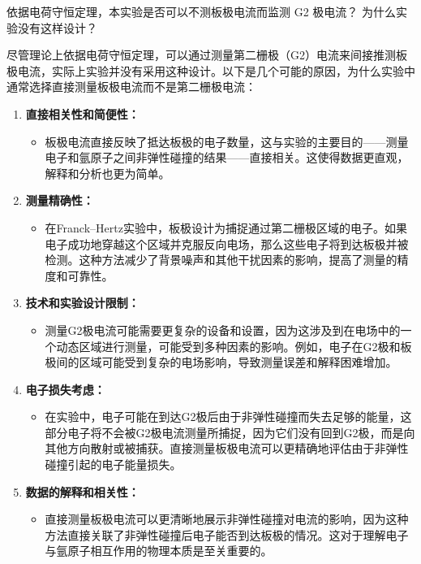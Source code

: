 \documentclass[dvipsnames, svgnames,a4paper,11pt]{article}
\begin{document}
	
	\begin{question}
		依据电荷守恒定理，本实验是否可以不测板极电流而监测 G2 极电流？ 为什么实验没有这样设计？
	\end{question}
	尽管理论上依据电荷守恒定理，可以通过测量第二栅极（G2）电流来间接推测板极电流，实际上实验并没有采用这种设计。以下是几个可能的原因，为什么实验中通常选择直接测量板极电流而不是第二栅极电流：	
	\begin{enumerate}
		\item \textbf{直接相关性和简便性：}
		
		\begin{itemize}
			\item 板极电流直接反映了抵达板极的电子数量，这与实验的主要目的——测量电子和氩原子之间非弹性碰撞的结果——直接相关。这使得数据更直观，解释和分析也更为简单。
		\end{itemize}
		
		\item \textbf{测量精确性：}
		
		\begin{itemize}
			\item 在Franck–Hertz实验中，板极设计为捕捉通过第二栅极区域的电子。如果电子成功地穿越这个区域并克服反向电场，那么这些电子将到达板极并被检测。这种方法减少了背景噪声和其他干扰因素的影响，提高了测量的精度和可靠性。
		\end{itemize}
		
		\item \textbf{技术和实验设计限制：}
		
		\begin{itemize}
			\item 测量G2极电流可能需要更复杂的设备和设置，因为这涉及到在电场中的一个动态区域进行测量，可能受到多种因素的影响。例如，电子在G2极和板极间的区域可能受到复杂的电场影响，导致测量误差和解释困难增加。
		\end{itemize}
		
		\item \textbf{电子损失考虑：}
		
		\begin{itemize}
			\item 在实验中，电子可能在到达G2极后由于非弹性碰撞而失去足够的能量，这部分电子将不会被G2极电流测量所捕捉，因为它们没有回到G2极，而是向其他方向散射或被捕获。直接测量板极电流可以更精确地评估由于非弹性碰撞引起的电子能量损失。
		\end{itemize}
		
		\item \textbf{数据的解释和相关性：}
		
		\begin{itemize}
			\item 直接测量板极电流可以更清晰地展示非弹性碰撞对电流的影响，因为这种方法直接关联了非弹性碰撞后电子能否到达板极的情况。这对于理解电子与氩原子相互作用的物理本质是至关重要的。
		\end{itemize}
	\end{enumerate}
	
\end{document}
